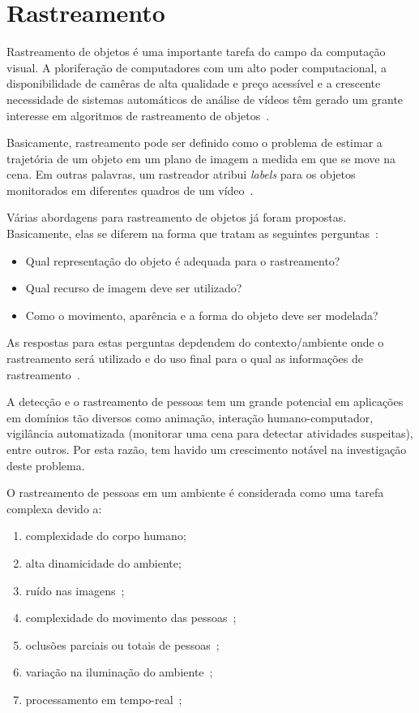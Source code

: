 \section {Rastreamento}	

	Rastreamento de objetos é uma importante tarefa do campo da computação visual. A ploriferação de computadores com um alto poder computacional, a disponibilidade de camêras de alta qualidade e preço acessível e a crescente necessidade de sistemas automáticos de análise de vídeos têm gerado um grante interesse em algoritmos de rastreamento de objetos~\cite{yilmaz}.

	Basicamente, rastreamento pode ser definido como o problema de estimar a trajetória de um objeto em um plano de imagem a medida em que se move na cena. Em outras palavras, um rastreador atribui \textit{labels} para os objetos monitorados em diferentes quadros de um vídeo~\cite{yilmaz}.

	Várias abordagens para rastreamento de objetos já foram propostas. Basicamente, elas se diferem na forma que tratam as seguintes perguntas~\cite{yilmaz}: 
		
		\begin{itemize}
			\item Qual representação do objeto é adequada para o rastreamento?
			\item Qual recurso de imagem deve ser utilizado?
			\item Como o movimento, aparência e a forma do objeto deve ser modelada? 
		\end{itemize}

	As respostas para estas perguntas depdendem do contexto/ambiente onde o rastreamento será utilizado e do uso final para o qual as informações de rastreamento~\cite{yilmaz}.
	

	A detecção e o rastreamento de pessoas tem um grande potencial em aplicações em domínios tão diversos como animação, interação humano-computador, vigilância automatizada (monitorar uma cena para detectar atividades suspeitas), entre outros. Por esta razão, tem havido um crescimento notável na investigação deste problema.

	O rastreamento de pessoas em um ambiente é considerada como uma tarefa complexa devido a:

		\begin{enumerate}
			\item complexidade do corpo humano;
			\item alta dinamicidade do ambiente;
			\item ruído nas imagens~\cite{yilmaz};
			\item complexidade do movimento das pessoas~\cite{yilmaz};
			\item oclusões parciais ou totais de pessoas~\cite{yilmaz};
			\item variação na iluminação do ambiente~\cite{yilmaz};
			\item processamento em tempo-real~\cite{yilmaz};
		\end{enumerate}

